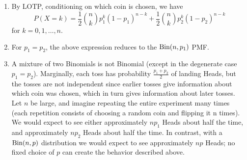 \documentclass[11pt]{article}
\begin{document}
\begin{solution}{3}
\vspace{-5mm}
\begin{enumerate}[label=(\alph*)]
\item By LOTP, conditioning on which coin is chosen, we have
$$P(X = k) = \frac{1}{2}\binom{n}{k}p_1^k(1 - p_1)^{n - k} + \frac{1}{2}\binom{n}{k}p_2^k(1 - p_2)^{n - k}$$
for $k = 0, 1, \ldots, n$.

\item For $p_1 = p_2$, the above expression reduces to the $\textrm{Bin}(n, p_1)$ PMF.

\item A mixture of two Binomials is not Binomial (except in the degenerate case $p_1 = p_2$). Marginally, each toss has probability $\frac{p_1 + p_2}{2}$ of landing Heads, but the tosses are not independent since earlier tosses give information about which coin was chosen, which in turn gives information about later tosses. \\
Let $n$ be large, and imagine repeating the entire experiment many times (each repetition consists of choosing a random coin and flipping it n times). We would expect to see either approximately $n p_1$ Heads about half the time, and approximately $n p_2$ Heads about half the time. In contrast, with a $\textrm{Bin}(n, p)$ distribution we would expect to see approximately $n p$ Heads; no fixed choice of $p$ can create the behavior described above.
\end{enumerate}

\end{solution}
\end{document}
